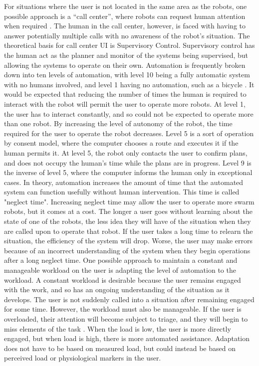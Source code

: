 \documentclass[]{article}
\begin{document}
For situations where the user is not located in the same area as the robots, one possible approach is a ``call center'', where robots can request human attention when required \cite{chen2011supervisory}. 
The human in the call center, however, is faced with having to answer potentially multiple calls with no awareness of the robot's situation. 
The theoretical basis for call center UI is Supervisory Control. 
Supervisory control has the human act as the planner and monitor of the systems being supervised, but allowing the systems to operate on their own.
Automation is frequently broken down into ten levels of automation, with level 10 being a fully automatic system with no humans involved, and level 1 having no automation, such as a bicycle \cite{parasuraman2000model}. 
It would be expected that reducing the number of times the human is required to interact with the robot will permit the user to operate more robots.
At level 1, the user has to interact constantly, and so could not be expected to operate more than one robot. 
By increasing the level of autonomy of the robot, the time required for the user to operate the robot decreases.  
Level 5 is a sort of operation by consent model, where the computer chooses a route and executes it if the human permits it. 
At level 5, the robot only contacts the user to confirm plans, and does not occupy the human's time while the plans are in progress. 
Level 9 is the inverse of level 5, where the computer informs the human only in exceptional cases. 
In theory, automation increases the amount of time that the automated system can function usefully without human intervention. 
This time is called "neglect time".
Increasing neglect time may allow the user to operate more swarm robots, but it comes at a cost. 
The longer a user goes without learning about the state of one of the robots, the less idea they will have of the situation when they are called upon to operate that robot. 
If the user takes a long time to relearn the situation, the efficiency of the system will drop. 
Worse, the user may make errors because of an incorrect understanding of the system when they begin operations after a long neglect time. 
One possible approach to maintain a constant and manageable workload on the user is adapting the level of automation to the workload. 
A constant workload is desirable because the user remains engaged with the work, and so has an ongoing understanding of the situation as it develops. 
The user is not suddenly called into a situation after remaining engaged for some time. 
However, the workload must also be manageable. 
If the user is overloaded, their attention will become subject to triage, and they will begin to miss elements of the task . 
When the load is low, the user is more directly engaged, but when load is high, there is more automated assistance. 
Adaptation does not have to be based on measured load, but could instead be based on perceived load or physiological markers in the user. 
\end{document}
